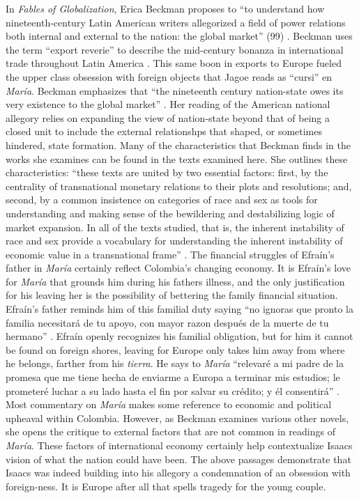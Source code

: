 \documentclass[12pt]{report}
\begin{document}
In \textit{Fables of Globalization}, Erica Beckman proposes to \enquote{to understand how nineteenth-century Latin American writers allegorized a field of power relations both internal and external to the nation: the global market} (99) \nocite{Beckman2013}. 
Beckman uses the term \enquote{export reverie} to describe the mid-century bonanza in international trade throughout Latin America \autocite[x]{Beckman2012}.
This same boon in exports to Europe fueled the upper class obsession with foreign objects that Jagoe reads as \enquote{cursi} en \textit{María}.
Beckman emphasizes that \enquote{the nineteenth century nation-state owes its very existence to the global market} \autocite[100]{Beckman2013}.
Her reading of the American national allegory relies on expanding the view of nation-state beyond that of being a closed unit to include the external relationshps that shaped, or sometimes hindered, state formation.
Many of the characteristics that Beckman finds in the works she examines can be found in the texts examined here.
She outlines these characteristics: \enquote{these texts are united by two essential factors: first, by the centrality of transnational monetary relations to their plots and resolutions; and, second, by a common insistence on categories of race and sex as tools for understanding and making sense of the bewildering and destabilizing logic of market expansion. In all of the texts studied, that is, the inherent instability of race and sex provide a vocabulary for understanding the inherent instability of economic value in a transnational frame} \autocite[101]{Beckman2013}.
The financial struggles of Efraín's father in \textit{María} certainly reflect Colombia's changing economy.
It is Efraín's love for \textit{María} that grounds him during his fathers illness, and the only justification for his leaving her is the possibility of bettering the family financial situation.
Efraín's father reminds him of this familial duty saying \enquote{no ignoras que pronto la familia necesitará de tu apoyo, con mayor razon después de la muerte de tu hermano} \autocite[??]{Isaacs2012}.
Efraín openly recognizes his familial obligation, but for him it cannot be found on foreign shores, leaving for Europe only takes him away from where he belongs, farther from his \textit{tierra}.
He says to \textit{María} \enquote{relevaré a mi padre de la promesa que me tiene hecha de enviarme a Europa a terminar mis estudios; le prometeré luchar a su lado hasta el fin por salvar su crédito; y él consentirá} \autocite[]{Isaacs2012}.
Most commentary on \textit{María} makes some reference to economic and political upheaval within Colombia.
However, as Beckman examines various other novels, she opens the critique to external factors that are not common in readings of \textit{María}.
These factors of international economy certainly help contextualize Isaacs vision of what the nation could have been.
The above passages demonstrate that Isaacs was indeed building into his allegory a condemnation of an obsession with foreign-ness.
It is Europe after all that spells tragedy for the young couple.
\end{document}
